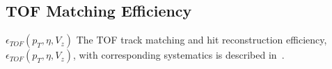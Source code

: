 \subsection{TOF Matching Efficiency}\label{section:star_TOFeffi}
$\epsilon_{TOF}\left(p_T,\eta,V_{z}\right)$
The TOF track matching and hit reconstruction efficiency, $\epsilon_{TOF}\left(p_T,\eta,V_{z}\right)$, with corresponding systematics is  described in~\cite{supplementaryNote}.